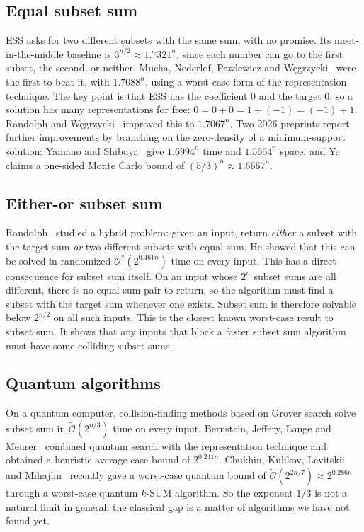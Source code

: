 \documentclass[11pt]{article}
\newcommand{\Oh}{\mathcal{O}}
\newcommand{\Ot}{\tilde{\mathcal{O}}}
\begin{document}
\subsection{Equal subset sum}
ESS asks for two different subsets with the same sum, with no promise. Its
meet-in-the-middle baseline is $3^{n/2}\approx1.7321^n$, since each number can
go to the first subset, the second, or neither. Mucha, Nederlof, Pawlewicz and
W\k{e}grzycki~\cite{mnpw} were the first to beat it, with $1.7088^n$, using a
worst-case form of the representation technique. The key point is that ESS has
the coefficient $0$ and the target $0$, so a solution has many representations
for free: $0=0+0=1+(-1)=(-1)+1$. Randolph and W\k{e}grzycki~\cite{rw} improved
this to $1.7067^n$. Two 2026 preprints report further improvements by branching
on the zero-density of a minimum-support solution: Yamano and Shibuya~\cite{ys}
give $1.6994^n$ time and $1.5664^n$ space, and Ye~\cite{ye} claims a one-sided
Monte Carlo bound of $(5/3)^n\approx1.6667^n$.

\subsection{Either-or subset sum}
Randolph~\cite{rand} studied a hybrid problem: given an input, return
\emph{either} a subset with the target sum \emph{or} two different subsets with
equal sum. He showed that this can be solved in randomized $\Oh^*(2^{0.461n})$
time on every input. This has a direct consequence for subset sum itself. On
an input whose $2^n$ subset sums are all different, there is no equal-sum pair
to return, so the algorithm must find a subset with the target sum whenever one
exists. Subset sum is therefore solvable below $2^{n/2}$ on all such inputs.
This is the closest known worst-case result to subset sum. It shows that any
inputs that block a faster subset sum algorithm must have some colliding
subset sums.

\subsection{Quantum algorithms}
On a quantum computer, collision-finding methods based on Grover search solve
subset sum in $\Ot(2^{n/3})$ time on every input. Bernstein, Jeffery, Lange
and Meurer~\cite{bjlm} combined quantum search with the representation
technique and obtained a heuristic average-case bound of $2^{0.241n}$. Chukhin,
Kulikov, Levitskii and Mihajlin~\cite{cklm} recently gave a worst-case quantum
bound of $\Ot(2^{2n/7})\approx2^{0.286n}$ through a worst-case quantum $k$-SUM
algorithm. So the exponent $1/3$ is not a natural limit in general; the
classical gap is a matter of algorithms we have not found yet.
\end{document}
